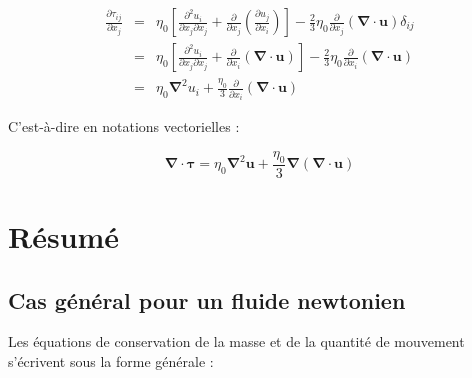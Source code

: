 \begin{eqnarray*}
\frac{\partial\tau_{ij}}{\partial x_{j}} & = & \eta_{0}\left[\frac{\partial^{2}u_{i}}{\partial x_{j}\partial x_{j}}+\frac{\partial}{\partial x_{j}}\left(\frac{\partial u_{j}}{\partial x_{i}}\right)\right]-\frac{2}{3}\eta_{0}\frac{\partial}{\partial x_{j}}(\boldsymbol{\nabla}\cdot\mathbf{u})\delta_{ij}\\
 & = & \eta_{0}\left[\frac{\partial^{2}u_{i}}{\partial x_{j}\partial x_{j}}+\frac{\partial}{\partial x_{i}}(\boldsymbol{\nabla}\cdot\mathbf{u})\right]-\frac{2}{3}\eta_{0}\frac{\partial}{\partial x_{i}}(\boldsymbol{\nabla}\cdot\mathbf{u})\\
 & = & \eta_{0}\boldsymbol{\nabla}^{2}u_{i}+\frac{\eta_{0}}{3}\frac{\partial}{\partial x_{i}}(\boldsymbol{\nabla}\cdot\mathbf{u})
\end{eqnarray*}


C'est-\`a-dire en notations vectorielles :

\begin{equation}
\boldsymbol{\nabla}\cdot\boldsymbol{\tau}=\eta_{0}\boldsymbol{\nabla}^{2}\mathbf{u}+\frac{\eta_{0}}{3}\boldsymbol{\nabla}(\boldsymbol{\nabla}\cdot\mathbf{u})\label{eq:ContraintVisq-constante}
\end{equation}



\chapter{R\'esum\'e}

\section{Cas g\'en\'eral pour un fluide newtonien}

Les \'equations de conservation de la masse et de la quantit\'e de mouvement
s'\'ecrivent sous la forme g\'en\'erale :


